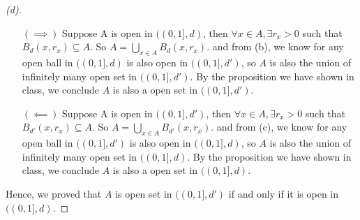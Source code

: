 \begin{proof}[(d)]
    \begin{itemize}
        \item [\((\implies )\)] Suppose A is open in $((0,1],d)$, then $\forall x\in A, \exists r_x > 0$ such that $B_d(x, r_x) \subseteq A$. So $A = \bigcup_{x\in A} B_d(x, r_x)$. and from (b), we know for any open ball in $((0,1],d)$ is also open in $((0,1],d')$, so $A$ is also the union of infinitely many open set in $((0,1],d')$. By the proposition we have shown in class, we conclude $A$ is also a open set in $((0,1],d')$.
        \item [\((\impliedby )\)] Suppose A is open in $((0,1],d')$, then $\forall x\in A, \exists r_x > 0$ such that $B_{d'}(x, r_x) \subseteq A$. So $A = \bigcup_{x\in A} B_{d'}(x, r_x)$. and from (c), we know for any open ball in $((0,1],d')$ is also open in $((0,1],d)$, so $A$ is also the union of infinitely many open set in $((0,1],d)$. By the proposition we have shown in class, we conclude $A$ is also a open set in $((0,1],d)$.
    \end{itemize}
    Hence, we proved that $A$ is open set in $((0,1],d')$ if and only if it is open in $((0,1],d)$.
\end{proof} 


